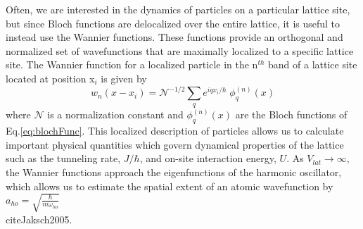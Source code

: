 Often, we are interested in the dynamics of particles on a particular lattice site, but since Bloch functions are delocalized over the entire lattice, it is useful to instead use the Wannier functions. 
These functions provide an orthogonal and normalized set of wavefunctions that are maximally localized to a specific lattice site. 
The Wannier function for a localized particle in the n$^{th}$ band of a lattice site located at position x$_i$ is given by \cite{Jaksch2005}
	\begin{equation} \label{eq:wannier}
		 w_{n}(x - x_i) = \mathcal{N}^{-1/2} \sum_q e^{iqx_i/ \hbar} \; \phi_q^{(n)}(x)
	\end{equation}
where $\mathcal{N}$ is a normalization constant and $\phi_q^{(n)}(x)$ are the Bloch functions of Eq.\;\ref{eq:blochFunc}.
This localized description of particles allows us to calculate important physical quantities which govern dynamical properties of the lattice such as the tunneling rate, $J/ \hbar$, and on-site interaction energy, $U$. 
As $V_{lat}\!\rightarrow\!\infty$, the Wannier functions approach the eigenfunctions of the harmonic oscillator, which allows us to estimate the spatial extent of an atomic wavefunction by $a_{ho} = \sqrt{\frac{\hbar}{m \omega_{ho}}}$ \\cite{Jaksch2005}.

